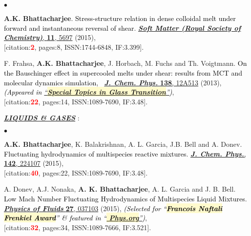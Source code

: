 \documentclass[margin,line]{res}
\newenvironment{list1}{
  \begin{list}{\ding{113}}{%
      \setlength{\itemsep}{0in}
      \setlength{\parsep}{0in} \setlength{\parskip}{0in}
      \setlength{\topsep}{0in} \setlength{\partopsep}{0in} 
      \setlength{\leftmargin}{0.17in}}}{\end{list}}
\newenvironment{list2}{
  \begin{list}{$\bullet$}{%
      \setlength{\itemsep}{0in}
      \setlength{\parsep}{0in} \setlength{\parskip}{0in}
      \setlength{\topsep}{0in} \setlength{\partopsep}{0in} 
      \setlength{\leftmargin}{0.2in}}}{\end{list}}
\begin{document}
\begin{resume}
\begin{list2}
\item {\bf A.K. Bhattacharjee}. \textcolor{black}{\textsf{Stress-structure relation in dense colloidal melt 
under forward and instantaneous reversal of shear}}. \href{http://pubs.rsc.org/en/content/articlelanding/2015/sm/c4sm02790f}{
\underline{\textit{\textbf{Soft Matter (Royal Society of Chemistry)}}}, {\bf 11}, 5697} (2015), \\{[citation:\textcolor{red}{\bf 2}, 
pages:8, ISSN:1744-6848, IF:3.399]}. 
\vspace{4mm}
\item F. Frahsa, {\bf A.K. Bhattacharjee}, J. Horbach, M. Fuchs and Th. Voigtmann. \textcolor{black}{\textsf{On the Bauschinger 
effect in supercooled melts under shear: results from MCT and molecular dynamics simulation}},$\;\;$ 
\href{https://aip.scitation.org/doi/abs/10.1063/1.4770336}{\underline{\textit{\textbf{J. Chem. Phys.}}} {\bf 138}, 12A513} (2013), 
\textcolor{black}{\small \it {(Appeared in \href{https://amitbny.github.io/akb.github.io/doc/JCP_ST.pdf}{``\colorbox{lemonchiffon}{\bf Special Topics in Glass Transition}''})}}, \\{[citation:\textcolor{red}{\bf 22}, pages:14, ISSN:1089-7690, IF:3.48]}.
\end{list2}
\vspace{4mm}
\begin{list1}
\item[] \textcolor{alizarin}{\ul{\textbf{\textit{LIQUIDS \& GASES}}} :}
\end{list1}
\vspace{2mm}
\begin{list2}
\item {\bf A.K. Bhattacharjee}, K. Balakrishnan, A. L. Garcia, J.B. Bell and A. Donev. \textcolor{black}{\textsf{
Fluctuating hydrodynamics of multispecies reactive mixtures}}. \href{http://scitation.aip.org/content/aip/journal/jcp/142/22/10.1063/1.4922308}{
\underline{\textit{\textbf{J. Chem. Phys.}}}, {\bf 142}, 224107} (2015), \\{[citation:\textcolor{red}{\bf 40}, pages:22, ISSN:1089-7690, IF:3.48]}.
\vspace{4mm}
\item A. Donev, A.J. Nonaka, {\bf A. K. Bhattacharjee}, A. L. Garcia and J. B. Bell. \textcolor{black}{\textsf{Low Mach Number 
Fluctuating Hydrodynamics of Multispecies Liquid Mixtures}}. \href{http://scitation.aip.org/content/aip/journal/pof2/27/3/10.1063/1.4913571}{\underline{\textit{\textbf{Physics of Fluids}}} {\bf 27}, 037103} (2015), \textcolor{black}{\small \it(Selected for ``\colorbox{lemonchiffon}{\bf Francois Naftali 
Frenkiel Award}'' \& featured in ``\href{http://phys.org/news/2015-03-mathematicians-fluids-mesoscale.html}{\colorbox{lemonchiffon}{\bf 
Phys.org}''})}, \\{[citation:\textcolor{red}{\bf 32}, pages:34, ISSN:1089-7666, IF:3.521]}.
\end{list2}


\end{resume}
\end{document}
